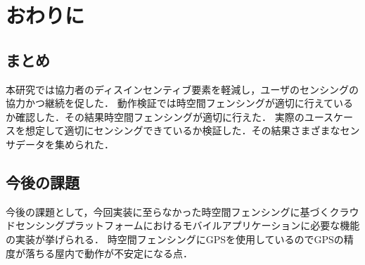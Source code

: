 \chapter{おわりに}
\thispagestyle{myheadings}

\section{まとめ}
本研究では協力者のディスインセンティブ要素を軽減し，ユーザのセンシングの協力かつ継続を促した．
動作検証では時空間フェンシングが適切に行えているか確認した．その結果時空間フェンシングが適切に行えた．
実際のユースケースを想定して適切にセンシングできているか検証した．その結果さまざまなセンサデータを集められた．

\section{今後の課題}
今後の課題として，今回実装に至らなかった時空間フェンシングに基づくクラウドセンシングプラットフォームにおけるモバイルアプリケーションに必要な機能の実装が挙げられる．
時空間フェンシングにGPSを使用しているのでGPSの精度が落ちる屋内で動作が不安定になる点．


